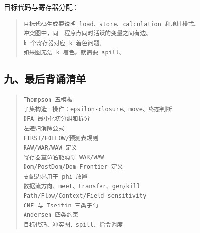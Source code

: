 \documentclass[UTF8,zihao=-4]{ctexart}
\begin{document}
目标代码与寄存器分配：


\begin{quote}
\footnotesize
\begin{verbatim}
目标代码生成要说明 load、store、calculation 和地址模式。
冲突图中，同一程序点同时活跃的变量之间有边。
k 个寄存器对应 k 着色问题。
如果图无法 k 着色，就需要 spill。
\end{verbatim}
\end{quote}


\subsection{九、最后背诵清单}


\begin{quote}
\footnotesize
\begin{verbatim}
Thompson 五模板
子集构造三操作：epsilon-closure、move、终态判断
DFA 最小化初分组和拆分
左递归消除公式
FIRST/FOLLOW/预测表规则
RAW/WAR/WAW 定义
寄存器重命名能消除 WAR/WAW
Dom/PostDom/Dom Frontier 定义
支配边界用于 phi 放置
数据流方向、meet、transfer、gen/kill
Path/Flow/Context/Field sensitivity
CNF 与 Tseitin 三类子句
Andersen 四类约束
目标代码、冲突图、spill、指令调度
\end{verbatim}
\end{quote}
\end{document}
